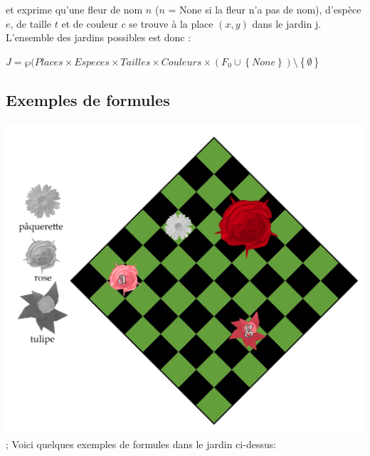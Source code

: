 \documentclass{article}
\theoremstyle{plain}
\theoremstyle{remark}
\begin{document}
\noindent
et exprime qu'une fleur de nom $n$ ($n$ = None si la fleur n'a pas de
nom), d'espèce $e$, de taille $t$ et de couleur $c$ se trouve à la
place $(x, y)$ dans le jardin j. L'ensemble des jardins possibles est
donc :
 
  \begin{center}
  $J = \wp(Places \times Especes \times Tailles \times Couleurs \times(F_0 \cup \left \{None\right \})\setminus\left \{\emptyset\right \}$ 
 \end{center}
 
\subsection{Exemples de formules}

\includegraphics{formulesDemo} ;
Voici quelques exemples de formules dans le jardin ci-dessus:
\end{document}
